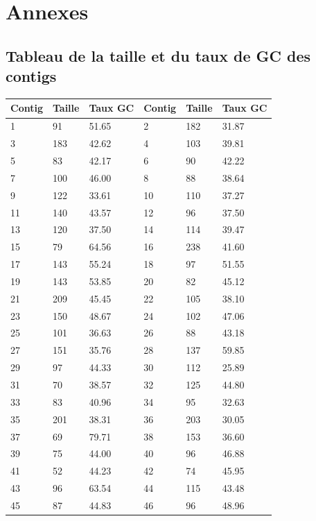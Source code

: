 \documentclass[10.9pt]{article} %
\begin{document}
\newpage
\appendix
\section{Annexes}

\subsection{Tableau de la taille et du taux de GC des contigs}\label{1}

\footnotesize{
\begin{longtable}{|p{2cm}|p{2cm}|p{2cm}|p{2cm}|p{2cm}|p{2cm}|}
\hline
Contig & Taille & Taux GC & Contig & Taille & Taux GC\\
\hline
1 & 91& 51.65 & 2 & 182& 31.87\\
\hline
3 & 183& 42.62 & 4 & 103& 39.81\\
\hline
5 & 83& 42.17 & 6 & 90& 42.22\\
\hline
7 & 100& 46.00 & 8 & 88& 38.64\\
\hline
9 & 122& 33.61 & 10 & 110& 37.27\\
\hline
11 & 140& 43.57 & 12 & 96& 37.50\\
\hline
13 & 120& 37.50 & 14 & 114& 39.47\\
\hline
15 & 79& 64.56 & 16 & 238& 41.60\\
\hline
17 & 143& 55.24 & 18 & 97& 51.55\\
\hline
19 & 143& 53.85 & 20 & 82& 45.12\\
\hline
21 & 209& 45.45 & 22 & 105& 38.10\\
\hline
23 & 150& 48.67 & 24 & 102& 47.06\\
\hline
25 & 101& 36.63 & 26 & 88& 43.18\\
\hline
27 & 151& 35.76 & 28 & 137& 59.85\\
\hline
29 & 97& 44.33 & 30 & 112& 25.89\\
\hline
31 & 70& 38.57 & 32 & 125& 44.80\\
\hline
33 & 83& 40.96 & 34 & 95& 32.63\\
\hline
35 & 201& 38.31 & 36 & 203& 30.05\\
\hline
37 & 69& 79.71 & 38 & 153& 36.60\\
\hline
39 & 75& 44.00 & 40 & 96& 46.88\\
\hline
41 & 52& 44.23 & 42 & 74& 45.95\\
\hline
43 & 96& 63.54 & 44 & 115& 43.48\\
\hline
45 & 87& 44.83 & 46 & 96& 48.96\\

\end{longtable}}
\end{document}
